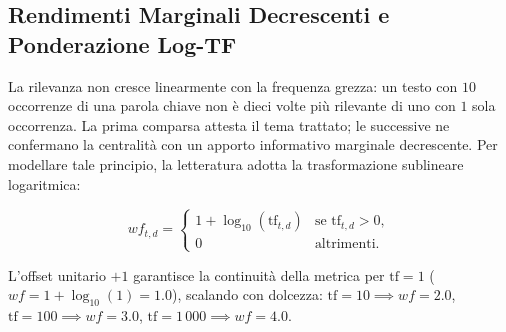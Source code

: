 \begin{table}[H]
\centering
\small
{}
\caption{Matrice di conteggio dei termini (\textit{Count Matrix}) su una selezione di opere di Shakespeare~\cite{manning2008}.}
\label{tab:shakespeare-counts}
\end{table}

\FloatBarrier
\subsection{Rendimenti Marginali Decrescenti e Ponderazione Log-TF}
\label{subsec:log-tf-diminishing-returns}

La rilevanza non cresce linearmente con la frequenza grezza: un testo con $10$ occorrenze di una parola chiave non \`e dieci volte pi\`u rilevante di uno con $1$ sola occorrenza. La prima comparsa attesta il tema trattato; le successive ne confermano la centralit\`a con un apporto informativo marginale decrescente.  
Per modellare tale principio, la letteratura adotta la trasformazione sublineare logaritmica:

\begin{definition}
\begin{equation}
wf_{t, d} = \begin{cases} 1 + \log_{10}(\text{tf}_{t, d}) & \text{se } \text{tf}_{t, d} > 0, \\ 0 & \text{altrimenti.} \end{cases}
\label{eq:log-tf}
\end{equation}
\end{definition}
L'offset unitario $+1$ garantisce la continuit\`a della metrica per $\text{tf}=1$ ($wf = 1 + \log_{10}(1) = 1.0$), scalando con dolcezza: $\text{tf}=10 \implies wf=2.0$, $\text{tf}=100 \implies wf=3.0$, $\text{tf}=1\,000 \implies wf=4.0$.

